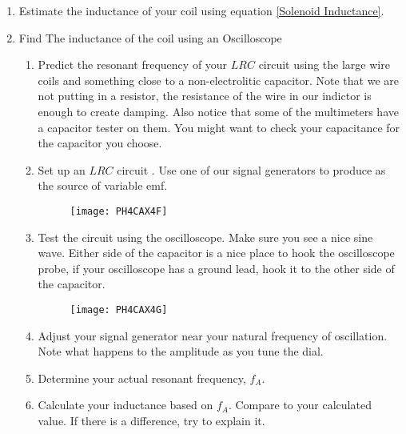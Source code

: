 \begin{enumerate}
	\item Estimate the inductance of your coil using equation \ref{Solenoid Inductance}.

	\item Find The inductance of the coil using an Oscilloscope

	\begin{enumerate}
		\item Predict the resonant frequency of your $LRC$ circuit using the large wire coils and something close to a non-electrolitic capacitor. Note that we are not putting in a resistor, the resistance of the wire in our indictor is enough to create damping. Also notice that some of the multimeters have a capacitor tester on them. You might want to check your capacitance for the capacitor you choose.

		\item Set up an $LRC$ circuit . Use one of our signal generators to produce as the source of variable emf. 
		\begin{figure}[h!]
			\centering
			\texttt{[image: PH4CAX4F]}
		\end{figure}

		\item Test the circuit using the oscilloscope. Make sure you see a nice sine wave. Either side of the capacitor is a nice place to hook the oscilloscope probe, if your oscilloscope has a ground lead, hook it to the other side of the capacitor.
		\begin{figure}[h!]
			\centering
			\texttt{[image: PH4CAX4G]}
		\end{figure}

		\item Adjust your signal generator near your natural frequency of oscillation. Note what happens to the amplitude as you tune the dial.

		\item Determine your actual resonant frequency, $f_{A}$.

		\item Calculate your inductance based on $f_{A}$. Compare to your calculated value. If there is a difference, try to explain it.
	\end{enumerate}
\end{enumerate}


\vfill
